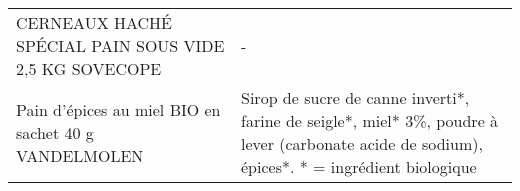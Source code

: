 \begin{longtable}{p{5cm}p{10cm}}
                                                    CERNEAUX HACHÉ SPÉCIAL PAIN SOUS VIDE 2,5 KG SOVECOPE &                                                                                                                                                                                                                                                                                                                                                                                                                                                                                                                                                                                                                                                                                                                                                                                                                                                                                                                                                                                                                                        - \\
                                                     Pain d'épices au miel BIO en sachet 40 g VANDELMOLEN &                                                                                                                                                                                                                                                                                                                                                                                                                                                                                                                                                                                                                                                                                                                                                                                                                                                                                           Sirop de sucre de canne inverti*, farine de seigle*, miel* 3\%, poudre à lever (carbonate acide de sodium), épices*.  * = ingrédient biologique \\

\end{longtable}
